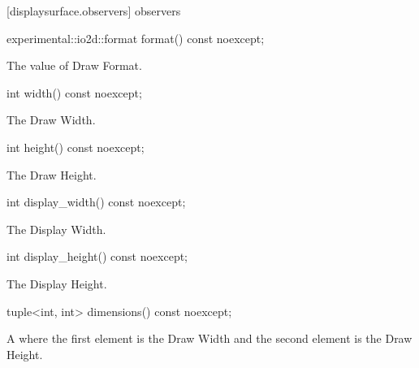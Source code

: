  [displaysurface.observers]{ observers}

\begin{itemdecl}
experimental::io2d::format format() const noexcept;
\end{itemdecl}
\begin{itemdescr}
\pnum
\returns
The value of Draw Format.
\end{itemdescr}

\begin{itemdecl}
int width() const noexcept;
\end{itemdecl}
\begin{itemdescr}
\pnum
\returns
The Draw Width.
\end{itemdescr}

\begin{itemdecl}
int height() const noexcept;
\end{itemdecl}
\begin{itemdescr}
\pnum
\returns
The Draw Height.
\end{itemdescr}

\begin{itemdecl}
int display_width() const noexcept;
\end{itemdecl}
\begin{itemdescr}
\pnum
\returns
The Display Width.
\end{itemdescr}

\begin{itemdecl}
int display_height() const noexcept;
\end{itemdecl}
\begin{itemdescr}
\pnum
\returns
The Display Height.
\end{itemdescr}

\begin{itemdecl}
tuple<int, int> dimensions() const noexcept;
\end{itemdecl}
\begin{itemdescr}
\pnum
\returns
A  where the first element is the Draw Width and the second element is the Draw Height.
\end{itemdescr}

